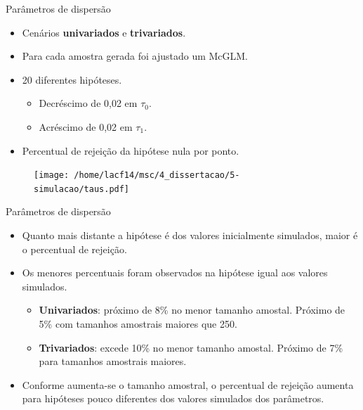 \documentclass[
  ignorenonframetext,
  serif,
  professionalfont,
  usenames,
  dvipsnames,
  aspectratio = 169]{beamer}
\begin{document}
\begin{frame}{Parâmetros de dispersão}
\protect\hypertarget{paruxe2metros-de-dispersuxe3o-1}{}
\begin{itemize}
  \itemsep 2ex
    \item Cenários \textbf{univariados} e \textbf{trivariados}.
    \item Para cada amostra gerada foi ajustado um McGLM.
  \item 20 diferentes hipóteses. 
    \begin{itemize}
      \item Decréscimo de 0,02 em $\tau_0$.
      \item Acréscimo de 0,02 em $\tau_1$.
    \end{itemize}

  \item Percentual de rejeição da hipótese nula por ponto. 

\end{itemize}
\end{frame}

\begin{frame}{}
\protect\hypertarget{section-1}{}
\begin{figure}[H]
\centering
\texttt{[image: /home/lacf14/msc/4\_dissertacao/5-simulacao/taus.pdf]}
\end{figure}
\end{frame}

\begin{frame}{Parâmetros de dispersão}
\protect\hypertarget{paruxe2metros-de-dispersuxe3o-2}{}
\begin{itemize}
  \itemsep 2ex
  
  \item Quanto mais distante a hipótese é dos valores inicialmente simulados, maior é o percentual de rejeição. 
  
  \item Os menores percentuais foram observados na hipótese igual aos valores simulados. 
    \begin{itemize}
      \item \textbf{Univariados}: próximo de 8\% no menor tamanho amostal. Próximo de 5\% com tamanhos amostrais maiores que 250. 
      \item \textbf{Trivariados}: excede 10\% no menor tamanho amostal. Próximo de 7\% para tamanhos amostrais maiores.
    \end{itemize}

  \item Conforme aumenta-se o tamanho amostral, o percentual de rejeição aumenta para hipóteses pouco diferentes dos valores simulados dos parâmetros.

\end{itemize}
\end{frame}
\end{document}
